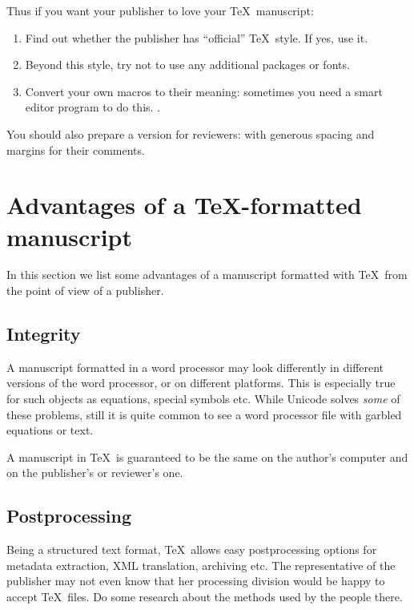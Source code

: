 \documentclass{article}
\begin{document}
Thus if you want your publisher to love your \TeX\ manuscript:
\begin{enumerate}
\item Find out whether the publisher has ``official'' \TeX\ style.  If
  yes, use it.
\item Beyond this style, try not to use any additional packages or fonts.
\item Convert your own macros to their meaning: sometimes you need a
  smart editor program to do this.  . 
\end{enumerate}

You should also prepare a version for reviewers: with generous spacing
and margins for their comments.

\section{Advantages of a \TeX-formatted manuscript}
\label{sec:advantages}

In this section we list some advantages of a manuscript formatted with
\TeX\ from the point of view of a publisher.

\subsection{Integrity}
\label{sec:integirty}

A manuscript formatted in a word processor may look differently in
different versions of the word processor, or on different platforms.
This is especially true for such objects as equations, special symbols
etc.  While Unicode solves \emph{some} of these problems, still it is
quite common to see a word processor file with garbled equations or
text.

A manuscript in \TeX\ is guaranteed to be the same on the author's
computer and on the publisher's or reviewer's one.

\subsection{Postprocessing}
\label{sec:postprocessing}

Being a structured text format, \TeX\ allows easy postprocessing
options for metadata extraction, XML translation, archiving etc.  The
representative of the publisher may not even know that her processing
division would be happy to accept \TeX\ files.  Do some research about
the methods used by the people there.  
\end{document}
